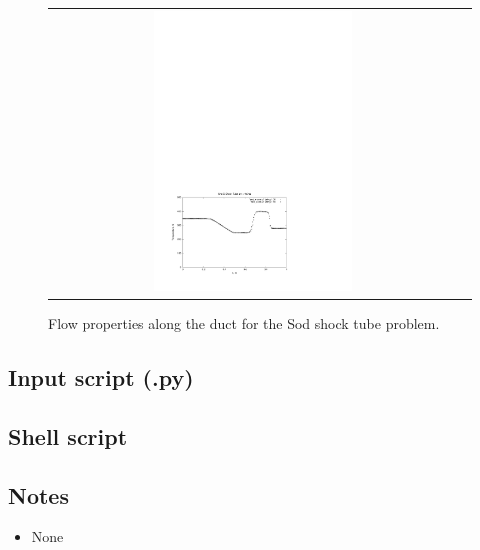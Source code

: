 \begin{figure}[htbp]
\begin{tabular}{cc}
\includegraphics[width=0.5\textwidth,viewport=51 58 400 298,clip=true]{../3D/sod/sod_T.pdf}
\end{tabular}
\caption{Flow properties along the duct for the Sod shock tube problem.}
\label{sod-3d-profiles-fig}
\end{figure}

\newpage
\subsection{Input script (.py)}
\label{sod-3d-py-file}
\topbar

\bottombar

\newpage
\subsection{Shell script}
\label{sod-3d-sh-files}
\topbar

\bottombar

\subsection{Notes}
\begin{itemize}
\item None
\end{itemize}

